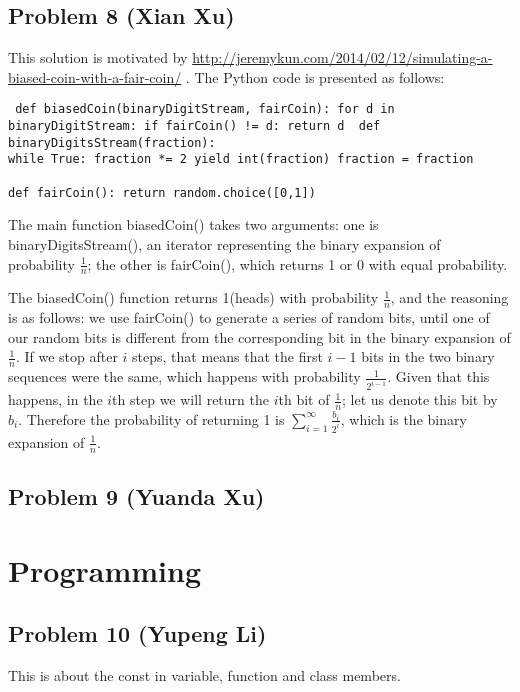 \documentclass[10pt]{article}
\begin{document}
\subsection*{Problem 8 (Xian Xu)}
This solution is motivated by
\url{http://jeremykun.com/2014/02/12/simulating-a-biased-coin-with-a-fair-coin/}
.
The Python code is presented as follows: 
\begin{lstlisting} def biasedCoin(binaryDigitStream, fairCoin): for d in binaryDigitStream: if fairCoin() != d: return d  def binaryDigitsStream(fraction):
while True: fraction *= 2 yield int(fraction) fraction = fraction

def fairCoin(): return random.choice([0,1]) \end{lstlisting}

The main function biasedCoin() takes two arguments: one is binaryDigitsStream(), an iterator representing the binary expansion of
probability $\frac{1}{n}$; the other is fairCoin(), which returns 1 or 0 with equal probability.

The biasedCoin() function returns 1(heads)
with probability $\frac{1}{n}$, and the reasoning is as follows: we use fairCoin() to generate a series of random bits, until one of our random bits is different
from the corresponding bit in the binary expansion of $\frac{1}{n}$. If we stop after $i$ steps, that means that the first $i -1$ bits in the two binary sequences were the same, which happens with probability $\frac{1}{2^{i -1}}$. Given that this happens, in the $i$th step we will return the $i$th bit of $\frac{1}{n}$; let us denote this bit by $b_{i}$. Therefore the probability of returning 1 is $\sum _{i =1}^{\infty }\frac{b_{i}}{2^{i}}$, which is the binary expansion of $\frac{1}{n}$.

\subsection*{Problem 9 (Yuanda Xu)}
\newpage

\section{Programming}

\subsection*{Problem 10 (Yupeng Li)}
This is about the const in variable, function and class members.
\end{document}

